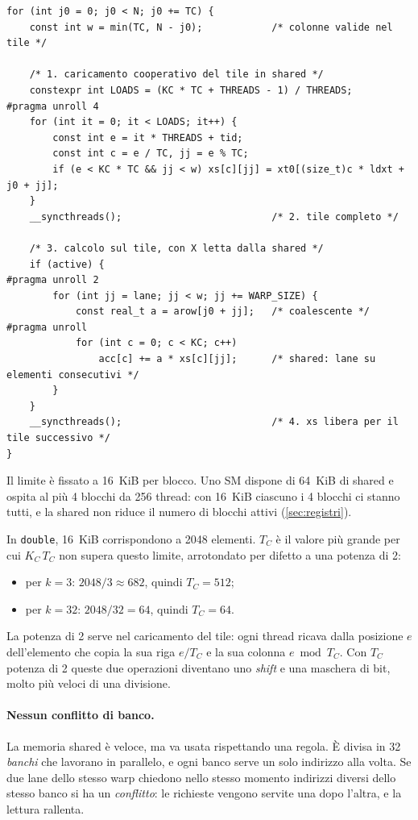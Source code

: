 \documentclass[11pt,a4paper]{article}
\begin{document}
\begin{lstlisting}[caption={Ciclo sui tile di \texttt{warp\_row\_smem} (\texttt{kernel\_warp\_row\_smem.cu}, commenti abbreviati).}, label={lst:warp-smem}]
for (int j0 = 0; j0 < N; j0 += TC) {
    const int w = min(TC, N - j0);            /* colonne valide nel tile */

    /* 1. caricamento cooperativo del tile in shared */
    constexpr int LOADS = (KC * TC + THREADS - 1) / THREADS;
#pragma unroll 4
    for (int it = 0; it < LOADS; it++) {
        const int e = it * THREADS + tid;
        const int c = e / TC, jj = e % TC;
        if (e < KC * TC && jj < w) xs[c][jj] = xt0[(size_t)c * ldxt + j0 + jj];
    }
    __syncthreads();                          /* 2. tile completo */

    /* 3. calcolo sul tile, con X letta dalla shared */
    if (active) {
#pragma unroll 2
        for (int jj = lane; jj < w; jj += WARP_SIZE) {
            const real_t a = arow[j0 + jj];   /* coalescente */
#pragma unroll
            for (int c = 0; c < KC; c++)
                acc[c] += a * xs[c][jj];      /* shared: lane su elementi consecutivi */
        }
    }
    __syncthreads();                          /* 4. xs libera per il tile successivo */
}
\end{lstlisting}

Il limite è fissato a \SI{16}{KiB} per blocco. Uno SM dispone di
\SI{64}{KiB} di shared e ospita al più 4 blocchi da 256 thread: con
\SI{16}{KiB} ciascuno i 4 blocchi ci stanno tutti, e la shared non riduce il
numero di blocchi attivi (\cref{sec:registri}).

In \texttt{double}, \SI{16}{KiB} corrispondono a 2048 elementi. $T_C$ è il
valore più grande per cui $K_C\,T_C$ non supera questo limite, arrotondato per
difetto a una potenza di 2:
\begin{itemize}
  \item per $k = 3$: $2048 / 3 \approx 682$, quindi $T_C = 512$;
  \item per $k = 32$: $2048 / 32 = 64$, quindi $T_C = 64$.
\end{itemize}

La potenza di 2 serve nel caricamento del tile: ogni thread ricava dalla
posizione $e$ dell'elemento che copia la sua riga $e / T_C$ e la sua colonna
$e \bmod T_C$. Con $T_C$ potenza di 2 queste due operazioni diventano uno
\emph{shift} e una maschera di bit, molto più veloci di una divisione.

\paragraph{Nessun conflitto di banco.} La memoria shared è veloce, ma va usata
rispettando una regola. È divisa in 32 \emph{banchi} che lavorano in parallelo,
e ogni banco serve un solo indirizzo alla volta. Se due lane dello stesso warp
chiedono nello stesso momento indirizzi diversi dello stesso banco si ha un
\emph{conflitto}: le richieste vengono servite una dopo l'altra, e la lettura
rallenta.
\end{document}
